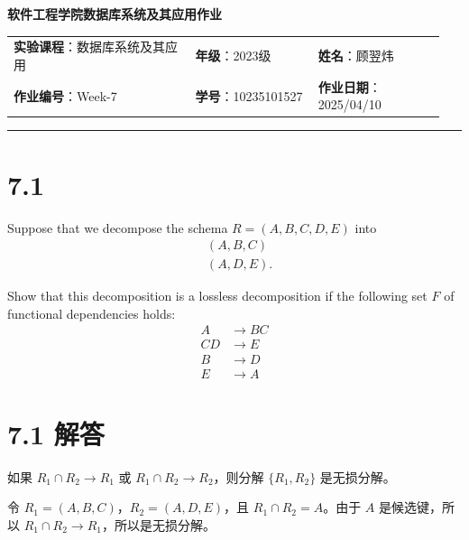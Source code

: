 \documentclass{article}
\begin{document}
	
	\begin{center}
		{\Large{\textbf{\heiti 软件工程学院数据库系统及其应用作业}}}
		\begin{table}[htb]
			\flushleft
			\begin{tabular}{p{0.4\linewidth}p{0.27\linewidth}p{0.28\linewidth}}\\
				\textbf{实验课程}：数据库系统及其应用  & \textbf{年级}：2023级       & \textbf{姓名}：顾翌炜  \\
				\textbf{作业编号}：Week-7    & \textbf{学号}：10235101527 & \textbf{作业日期}：2025/04/10  \\
			\end{tabular}
		\end{table}
	\end{center}
	\rule{\textwidth}{2pt}
	
	\setlength{\parindent}{2em}
	
	\section*{7.1}
	
	Suppose that we decompose the schema $R = (A, B, C, D, E)$ into
	\begin{equation}
		\begin{aligned}
			& (A, B, C) \\
			& (A, D, E).
		\end{aligned}
	\end{equation}
	
	Show that this decomposition is a lossless decomposition if the following set $F$ of functional dependencies holds:
	\begin{equation}
		\begin{aligned}
			A & \rightarrow BC \\
			CD & \rightarrow E \\
			B & \rightarrow D \\
			E & \rightarrow A
		\end{aligned}
	\end{equation}
	
	\section*{7.1 解答}
	
	如果 $R_1 \cap R_2 \to R_1$ 或 $R_1 \cap R_2 \to R_2$，则分解 $\{R_1, R_2\}$ 是无损分解。
	
	令 $R_1 = (A, B, C)$，$R_2 = (A, D, E)$，且 $R_1 \cap R_2 = A$。由于 $A$ 是候选键，所以 $R_1 \cap R_2 \to R_1$，所以是无损分解。
	
\end{document}
